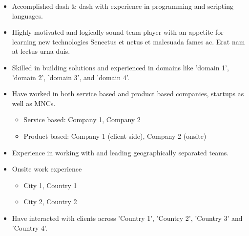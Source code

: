 \documentclass[10pt, a4paper]{cvhari}
\begin{document}
\makecvheader
\medskip



\begin{itemize}
    \item Accomplished dash \& dash with experience in programming and scripting languages.
    \item Highly motivated and logically sound team player with an appetite for learning new technologies Senectus et netus et malesuada fames ac. Erat nam at lectus urna duis.
    \item Skilled in building solutions and experienced in domains like 'domain 1', 'domain 2', 'domain 3', and 'domain 4'.
\end{itemize}
\medskip




\begin{itemize}
    \item Have worked in both service based and product based companies, startups as well as MNCs.\smallskip
        \begin{itemize}[label=\dashedbullets]
            \item Service based: Company 1, Company 2
            \item Product based: Company 1 (client side), Company 2 (onsite)
        \end{itemize}
    \item Experience in working with and leading geographically separated teams.
    \item Onsite work experience\smallskip
        \begin{itemize}[label=\dashedbullets]
            \item City 1, Country 1
            \item City 2, Country 2
        \end{itemize}
    \item Have interacted with clients across 'Country 1', 'Country 2', 'Country 3' and 'Country 4'.
\end{itemize}

\medskip
\end{document}
